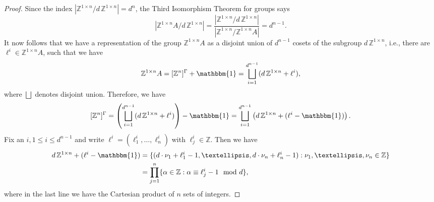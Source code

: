 \documentclass[letterpaper,11pt,reqno]{amsart}
\theoremstyle{plain}
\theoremstyle{definition}
\theoremstyle{remark}
\theoremstyle{remark}
\numberwithin{equation}{section}
\newcommand{\one}{\mathbbm{1}}
\newcommand{\Z}{{\mathbb Z}}
\begin{document}
\begin{proof}
Since the index $\left|\Z^{1 \times n} / d \, \Z^{1 \times n} \right|=d^n$, the Third Isomorphism Theorem for groups says
\begin{equation*}
\left|\Z^{1 \times n}A / d \, \Z^{1 \times n} \right| = \frac{\left| \Z^{1 \times n} / d\,\Z^{1 \times n} \right|}{\left| \Z^{1 \times n}/ \Z^{1 \times n} A \right|} = d^{n-1}.
\end{equation*}
It now follows that we have a representation of the group $\Z^{1 \times n} A$ as a disjoint union of $d^{n-1}$ cosets of the subgroup $d\,\Z^{1 \times n}$, i.e., there are  $\ell^i\in  \Z^{1 \times n} A $, such that we have
\[ \Z^{1 \times n} A=[\Z^n]^\Gamma+\one= \bigsqcup_{i=1}^{d^{n-1}}(d\,\Z^{1 \times n}+\ell^i), \]
where  $\bigsqcup$ denotes disjoint union. Therefore, we have
\[    
[\Z^n]^\Gamma = \left(\bigsqcup_{i=1}^{d^{n-1}}(d\,\Z^{1 \times n}+\ell^i)\right)-\one
= \bigsqcup_{i=1}^{d^{n-1}}\left(d\,\Z^{1 \times n}+(\ell^i-\one)\right).
\]
Fix an $i, 1\leq i \leq d^{n-1}$ and write $\ell^i=(\ell^i_1,\dots, \ell^i_n)$ with $\ell^i_j\in \Z$. 
Then we have
\begin{align}
d\,\Z^{1 \times n}+(\ell^i-\one)&=\{(d\cdot \nu_1+\ell^i_1 -1, \dots, d\cdot \nu_n+\ell^i_n -1): \nu_1, \dots, \nu_n\in \Z\}\notag\\
&= \prod_{j=1}^n\{\alpha\in \Z: \alpha\equiv \ell^i_j-1 \mod d\}, \label{eq-prod1}
\end{align}
where in the last line we have the Cartesian product of $n$ sets of integers. 


\end{proof}
\end{document}
